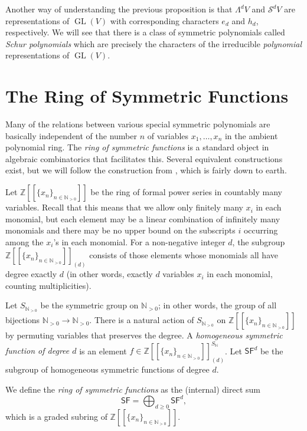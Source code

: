 \documentclass[12pt]{article}
\theoremstyle{plain}
\theoremstyle{definition}
\theoremstyle{remark}
\numberwithin{equation}{section}
\begin{document}
Another way of understanding the previous proposition is that
$\Lambda^d V$ and $\mathcal{S}^d V$ are representations of
$\operatorname{GL}(V)$ with corresponding characters $e_d$ and
$h_d$, respectively.
We will see that there is a class of symmetric polynomials
called \emph{Schur polynomials} which are precisely the characters
of the irreducible \emph{polynomial} representations of
$\operatorname{GL}(V)$.


\section{The Ring of Symmetric Functions}

Many of the relations between various special symmetric polynomials are
basically independent of the number $n$ of variables $x_1,\ldots,x_n$
in the ambient polynomial ring.  The \emph{ring of symmetric functions}
is a standard object in algebraic combinatorics that facilitates
this.  Several equivalent constructions exist, but we will follow
the construction from \cite{Stanley2}, which is fairly down to earth.

Let $\mathbb{Z}[[\{x_n\}_{n \in \mathbb{N}_{>0}}]]$ be the ring of formal
power series in countably many variables.  Recall that this means that
we allow only finitely many $x_i$ in each monomial, but each element may be
a linear combination of infinitely many monomials and there may be no upper
bound on the subscripts $i$ occurring among the $x_i$'s in each
monomial.
For a non-negative integer $d$, the subgroup
$\mathbb{Z}[[\{x_n\}_{n \in \mathbb{N}_{>0}}]]_{(d)}$ consists of those
elements whose monomials all have degree exactly $d$ (in other words,
exactly $d$ variables $x_i$ in each monomial, counting multiplicities).

Let $S_{\mathbb{N}_{>0}}$ be the symmetric group on $\mathbb{N}_{>0}$; in other
words, the group of all bijections $\mathbb{N}_{>0} \to \mathbb{N}_{>0}$.
There is a natural action of $S_{\mathbb{N}_{>0}}$ on
$\mathbb{Z}[[\{x_n\}_{n \in \mathbb{N}_{>0}}]]$ by permuting variables that
preserves the degree.
A \emph{homogeneous symmetric function of degree $d$} is an element
$f \in \mathbb{Z}[[\{x_n\}_{n \in \mathbb{N}_{>0}}]]_{(d)}^{S_{\mathbb{N}}}$.
Let $\mathsf{SF}^d$ be the subgroup of
homogeneous symmetric functions of degree $d$.

We define the \emph{ring of symmetric functions} as the (internal) direct sum
\[
\mathsf{SF} = \bigoplus_{d \ge 0} \mathsf{SF}^d,
\]
which is a graded subring of $\mathbb{Z}[[\{x_n\}_{n \in \mathbb{N}_{>0}}]]$.
\end{document}
